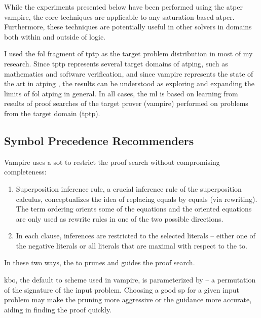 While the experiments presented below have been performed using the \gls{atper} \gls{vampire},
the core techniques are applicable to any \gls{saturation}-based \gls{atper}.
Furthermore, these techniques are potentially useful in other solvers in domains both within and outside of logic.

I used the \gls{fol} fragment of \gls{tptp} as the target problem distribution in most of my research.
Since \gls{tptp} represents several target domains of \gls{atping},
such as mathematics and software verification,
and since \gls{vampire} represents the state of the art in \gls{atping} \cite{casc-j12,DBLP:journals/aicom/SutcliffeD23},
the results can be understood as exploring and expanding the limits of \gls{fol} \gls{atping} in general.
In all cases, the \gls{ml} is based on learning from results of proof searches of the target prover (\gls{vampire}) performed on problems from the target domain (\gls{tptp}).

\subsection{Symbol Precedence Recommenders}
\label{sec:contrib:SymbolPrecedenceRecommenders}

Vampire uses a \gls{sot} \cite{} to restrict the proof search without compromising completeness:
\begin{enumerate}
\item Superposition inference rule, a crucial inference rule of the superposition calculus, conceptualizes the idea of replacing equals by equals (via rewriting).
The term ordering orients some of the equations and the oriented equations are only used as rewrite rules in one of the two possible directions.
\item In each clause, inferences are restricted to the selected literals --
either one of the negative literals
or all literals that are maximal with respect to the \gls{to}.
\end{enumerate}
In these two ways, the \gls{to} prunes and guides the proof search.

\Gls{kbo}, the default \gls{to} scheme used in \gls{vampire}, is parameterized by  -- a permutation of the \gls{signature} of the input problem.
Choosing a good \gls{sp} for a given input problem
may make the pruning more aggressive or the guidance more accurate,
aiding in finding the proof quickly.

